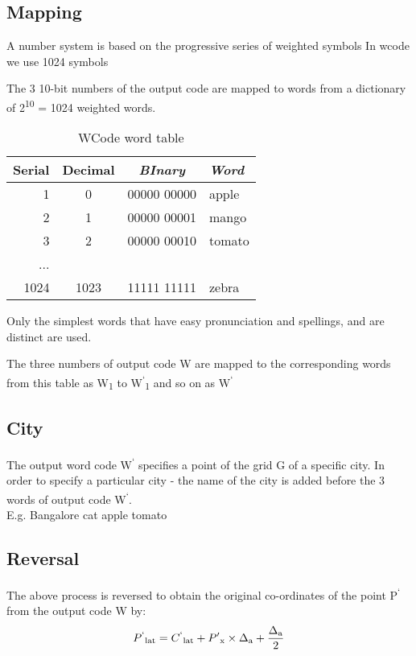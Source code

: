\documentclass[conference]{IEEEtran}
\begin{document}
\subsection{Mapping}

A number system is based on the progressive series of weighted symbols
In wcode we use 1024 symbols

The 3 10-bit numbers of the output code are mapped to words from a dictionary of 2\textsuperscript{10} = 1024 weighted words.
\begin{table}[h!]
\caption{WCode word table} \begin{center}
\begin{tabular}{r|c|c|l}
\textbf{Serial} & \textbf{Decimal} & \textbf{\textit{BInary}} & \textbf{\textit{Word}} \\
\hline
1 & 0 & 00000 00000 & apple\\
\hline
2 & 1 & 00000 00001 & mango \\
\hline
3 & 2 & 00000 00010 & tomato \\
... & & & \\
1024 & 1023 & 11111 11111 & zebra
\end{tabular}
\end{center} \end{table}

Only the simplest words that have easy pronunciation and spellings, and are distinct are used.

The three numbers of output code W are mapped to the corresponding words from this table as W\textsubscript{1} to W\textsuperscript{`}\textsubscript{1} and so on as W\textsuperscript{`}
\subsection{City}
The output word code W\textsuperscript{`} specifies a point of the grid G of a specific city. In order to specify a particular city - the name of the city is added before the 3 words of output code W\textsuperscript{`}.\\

E.g. Bangalore cat apple tomato

\subsection{Reversal}\label{AA}
The above process is reversed to obtain the original co-ordinates of the point P\textsuperscript{`} from the output code W by:
\begin{equation}P\textsuperscript{`}\textsubscript{lat} = C\textsuperscript{`}\textsubscript{lat} +  P'\textsubscript{x} \times \Delta\textsubscript{a} + \frac{\Delta\textsubscript{a}}{2}\end{equation}
\end{document}
